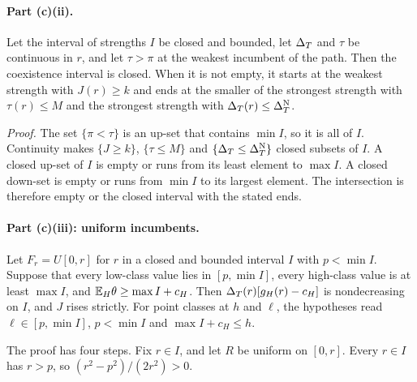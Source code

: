 \paragraph{Part (c)(ii).} Let the interval of strengths \(I\) be closed and bounded, let \(\Delta_T\) and \(\tau\) be
continuous in \(r\), and let \(\tau>\pi\) at the weakest incumbent of the path. Then the coexistence interval is
closed. When it is not empty, it starts at the weakest strength with \(J(r)\ge k\) and ends at the smaller of the
strongest strength with \(\tau(r)\le M\) and the strongest strength with \(\Delta_T(r)\le\Delta_T^{\rm N}\).

\emph{Proof.} The set \(\{\pi<\tau\}\) is an up-set that contains \(\min I\), so it is all of \(I\). Continuity makes
\(\{J\ge k\}\), \(\{\tau\le M\}\) and \(\{\Delta_T\le\Delta_T^{\rm N}\}\) closed subsets of \(I\). A closed up-set of \(I\) is
empty or runs from its least element to \(\max I\). A closed down-set is empty or runs from \(\min I\) to its largest
element. The intersection is therefore empty or the closed interval with the stated ends.

\paragraph{Part (c)(iii): uniform incumbents.} Let \(F_r=U[0,r]\) for \(r\) in a closed and bounded interval \(I\)
with \(p<\min I\). Suppose that every low-class value lies in \([p,\min I]\), every high-class value is at least
\(\max I\), and \(\mathbb{E}_H\theta\ge\max I+c_H\). Then \(\Delta_T(r)[g_H(r)-c_H]\) is nondecreasing on \(I\), and \(J\) rises
strictly. For point classes at \(h\) and \(\ell\), the hypotheses read \(\ell\in[p,\min I]\), \(p<\min I\) and
\(\max I+c_H\le h\).

The proof has four steps. Fix \(r\in I\), and let \(R\) be uniform on \([0,r]\). Every \(r\in I\) has \(r>p\), so
\((r^2-p^2)/(2r^2)>0\).

